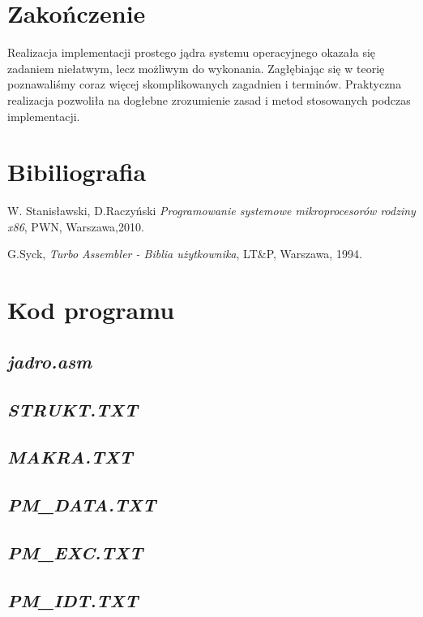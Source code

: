 \documentclass[a4paper,12pt]{article}
\begin{document}
	
	\section{Zakończenie}
		Realizacja implementacji prostego jądra systemu operacyjnego okazała się zadaniem niełatwym, lecz możliwym do wykonania. Zagłębiając się w teorię poznawaliśmy coraz więcej skomplikowanych zagadnien i  terminów.  Praktyczna realizacja pozwoliła na dogłebne zrozumienie zasad i metod stosowanych podczas implementacji. 
	
	\section{Bibiliografia}
\begin{thebibliography}{999}
 W. Stanisławski, D.Raczyński 
{\em Programowanie systemowe mikroprocesorów rodziny x86},
PWN, Warszawa,2010.

 G.Syck,
{\em Turbo Assembler - Biblia użytkownika}, 
LT\&P, Warszawa, 1994.



\end{thebibliography}	



\section{Kod programu}

\lstset{numbers=left}

\subsection{\textit{jadro.asm}}


\subsection{\textit{STRUKT.TXT}}


\subsection{\textit{MAKRA.TXT}}


\subsection{\textit{PM\_DATA.TXT}}


\subsection{\textit{PM\_EXC.TXT}}


\subsection{\textit{PM\_IDT.TXT}}

\end{document}
